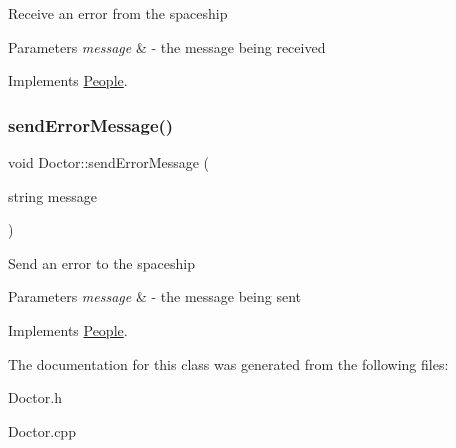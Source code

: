 Receive an error from the spaceship 
\begin{DoxyParams}{Parameters}
{\em message} & -\/ the message being received \\
\hline
\end{DoxyParams}


Implements \hyperlink{classPeople_a0685df78be631783138865e03cc7c85d}{People}.

\mbox{\label{classDoctor_a5a524981ce52102f975cf9c569137ce5}} 
\subsubsection{\texorpdfstring{send\+Error\+Message()}{sendErrorMessage()}}
{\footnotesize\ttfamily void Doctor\+::send\+Error\+Message (\begin{DoxyParamCaption}\item[{string}]{message }\end{DoxyParamCaption})\hspace{0.3cm}{\ttfamily [virtual]}}

Send an error to the spaceship 
\begin{DoxyParams}{Parameters}
{\em message} & -\/ the message being sent \\
\hline
\end{DoxyParams}


Implements \hyperlink{classPeople_a572a35170f61d1848eb04b65baafb057}{People}.



The documentation for this class was generated from the following files\+:\begin{DoxyCompactItemize}
\item 
Doctor.\+h\item 
Doctor.\+cpp\end{DoxyCompactItemize}
